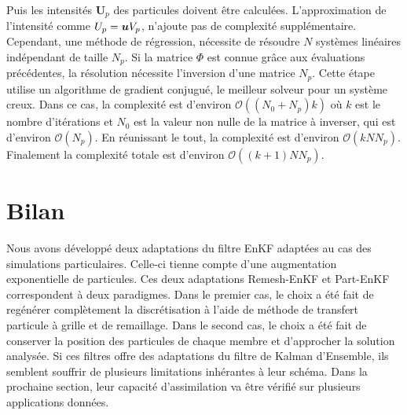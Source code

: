 Puis les intensités $\bm U_p$ des particules doivent être calculées. L'approximation de l'intensité comme $U_p = \bm{u} V_p$, n'ajoute pas de complexité supplémentaire. Cependant, une méthode de régression, nécessite de résoudre $N$ systèmes linéaires indépendant de taille $N_p$. Si la matrice $\Phi$ est connue grâce aux évaluations précédentes, la résolution nécessite l'inversion d'une matrice $N_p$. Cette étape utilise un algorithme de gradient conjugué, le meilleur solveur pour un système creux. Dans ce cas, la complexité est d'environ $\mathcal{O}((N_0 + N_p) k)$ où $k$ est le nombre d'itérations et $N_0$ est la valeur non nulle de la matrice à inverser, qui est d'environ $\mathcal{O}(N_p)$. En réunissant le tout, la complexité est d'environ $\mathcal{O}(kNN_p)$. Finalement la complexité totale est d'environ $\mathcal{O}((k+1)NN_p)$.

\section{Bilan}

Nous avons développé deux adaptations du filtre EnKF adaptées au cas des simulations particulaires. Celle-ci tienne compte d'une augmentation exponentielle de particules.
Ces deux adaptations Remesh-EnKF et Part-EnKF correspondent à deux paradigmes. Dans le premier cas, le choix a été fait de regénérer complètement la discrétisation à l'aide de méthode de transfert particule à grille et de remaillage. Dans le second cas, le choix a été fait de conserver la position des particules de chaque membre et d'approcher la solution analysée.
Si ces filtres offre des adaptations du filtre de Kalman d'Ensemble, ils semblent souffrir de plusieurs limitations inhérantes à leur schéma. Dans la prochaine section, leur capacité d'assimilation va être vérifié sur plusieurs applications données.

